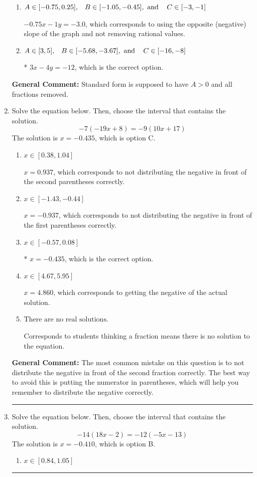 \documentclass{extbook}[14pt]
\newcommand{\litem}[1]{\item #1

\rule{\textwidth}{0.4pt}}
\begin{document}
\begin{enumerate}
{\begin{enumerate}[label=\Alph*.]
 $-0.75x + 1y = 3.0$, which corresponds to not removing rational values for Standard Form.
\item \( A \in [-0.75, 0.25], \hspace{3mm} B \in [-1.05, -0.45], \text{ and } \hspace{3mm} C \in [-3, -1] \)

 $-0.75x - 1y = -3.0$, which corresponds to using the opposite (negative) slope of the graph and not removing rational values.
\item \( A \in [3, 5], \hspace{3mm} B \in [-5.68, -3.67], \text{ and } \hspace{3mm} C \in [-16, -8] \)

* $3x - 4y = -12$, which is the correct option.
\end{enumerate}

\textbf{General Comment:} Standard form is supposed to have $A > 0$ and all fractions removed.
}
\litem{
Solve the equation below. Then, choose the interval that contains the solution.
\[ -7(-19x + 8) = -9(10x + 17) \]
The solution is \( x = -0.435 \), which is option C.\begin{enumerate}[label=\Alph*.]
\item \( x \in [0.38, 1.04] \)

$x = 0.937$, which corresponds to not distributing the negative in front of the second parentheses correctly.
\item \( x \in [-1.43, -0.44] \)

$x = -0.937$, which corresponds to not distributing the negative in front of the first parentheses correctly.
\item \( x \in [-0.57, 0.08] \)

* $x = -0.435$, which is the correct option.
\item \( x \in [4.67, 5.95] \)

$x = 4.860$, which corresponds to getting the negative of the actual solution.
\item \( \text{There are no real solutions.} \)

Corresponds to students thinking a fraction means there is no solution to the equation.
\end{enumerate}

\textbf{General Comment:} The most common mistake on this question is to not distribute the negative in front of the second fraction correctly. The best way to avoid this is putting the numerator in parentheses, which will help you remember to distribute the negative correctly.
}
\litem{
Solve the equation below. Then, choose the interval that contains the solution.
\[ -14(18x -2) = -12(-5x -13) \]
The solution is \( x = -0.410 \), which is option B.\begin{enumerate}[label=\Alph*.]
\item \( x \in [0.84, 1.05] \)


\end{enumerate}}
\end{enumerate}
\end{document}
